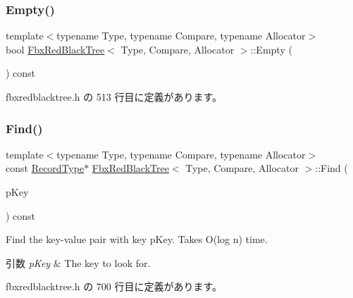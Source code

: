 \subsubsection{\texorpdfstring{Empty()}{Empty()}}
{\footnotesize\ttfamily template$<$typename Type, typename Compare, typename Allocator$>$ \\
bool \hyperlink{class_fbx_red_black_tree}{Fbx\+Red\+Black\+Tree}$<$ Type, Compare, Allocator $>$\+::Empty (\begin{DoxyParamCaption}{ }\end{DoxyParamCaption}) const\hspace{0.3cm}{\ttfamily [inline]}}



 fbxredblacktree.\+h の 513 行目に定義があります。

\mbox{\label{class_fbx_red_black_tree_a08a08c8b1a259c5d5bba01558198e4cb}} 
\subsubsection{\texorpdfstring{Find()}{Find()}\hspace{0.1cm}{\footnotesize\ttfamily [1/2]}}
{\footnotesize\ttfamily template$<$typename Type, typename Compare, typename Allocator$>$ \\
const \hyperlink{class_fbx_red_black_tree_1_1_record_type}{Record\+Type}$\ast$ \hyperlink{class_fbx_red_black_tree}{Fbx\+Red\+Black\+Tree}$<$ Type, Compare, Allocator $>$\+::Find (\begin{DoxyParamCaption}\item[{const \hyperlink{class_fbx_red_black_tree_a241b31c6972995417d193458b7bb27e2}{Key\+Type} \&}]{p\+Key }\end{DoxyParamCaption}) const\hspace{0.3cm}{\ttfamily [inline]}}

Find the key-\/value pair with key p\+Key. Takes O(log n) time. 
\begin{DoxyParams}{引数}
{\em p\+Key} & The key to look for. \\
\hline
\end{DoxyParams}


 fbxredblacktree.\+h の 700 行目に定義があります。

\mbox{\label{class_fbx_red_black_tree_a10d0f431d89e767bee24812cc4be9f3f}} 
